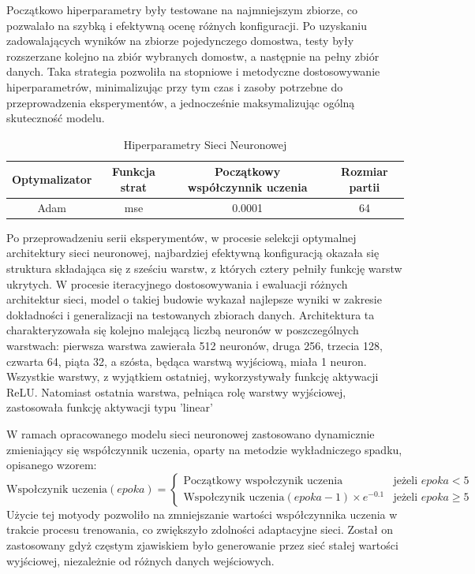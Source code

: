 \documentclass[a4paper,twoside,12pt]{book}
\begin{document}
Początkowo hiperparametry były testowane na najmniejszym zbiorze, co pozwalało na szybką i efektywną ocenę różnych konfiguracji. Po uzyskaniu zadowalających wyników na zbiorze pojedynczego domostwa, testy były rozszerzane kolejno na zbiór wybranych domostw, a następnie na pełny zbiór danych. Taka strategia pozwoliła na stopniowe i metodyczne dostosowywanie hiperparametrów, minimalizując przy tym czas i zasoby potrzebne do przeprowadzenia eksperymentów, a jednocześnie maksymalizując ogólną skuteczność modelu.
\begin{table}[!h]
	\centering
	\caption{Hiperparametry Sieci Neuronowej}
	\begin{tabular}{|c|c|c|c|}
		\hline
		Optymalizator & Funkcja strat & Początkowy współczynnik uczenia & Rozmiar partii \\ \hline
		Adam          & mse           & 0.0001                          & 64             \\ \hline
	\end{tabular}
\end{table}

Po przeprowadzeniu serii eksperymentów, w procesie selekcji optymalnej architektury sieci neuronowej, najbardziej efektywną konfiguracją okazała się struktura składająca się z sześciu warstw, z których cztery pełniły funkcję warstw ukrytych. W procesie iteracyjnego dostosowywania i ewaluacji różnych architektur sieci, model o takiej budowie wykazał najlepsze wyniki w zakresie dokładności i generalizacji na testowanych zbiorach danych. Architektura ta charakteryzowała się kolejno malejącą liczbą neuronów w poszczególnych warstwach: pierwsza warstwa zawierała 512 neuronów, druga 256, trzecia 128, czwarta 64, piąta 32, a szósta, będąca warstwą wyjściową, miała 1 neuron. Wszystkie warstwy, z wyjątkiem ostatniej, wykorzystywały funkcję aktywacji ReLU. Natomiast ostatnia warstwa, pełniąca rolę warstwy wyjściowej, zastosowała funkcję aktywacji typu 'linear'


W ramach opracowanego modelu sieci neuronowej zastosowano dynamicznie zmieniający się współczynnik uczenia, oparty na metodzie wykładniczego spadku, opisanego wzorem:
\begin{equation}
	\text{Wspołczynik uczenia}(epoka) =
	\begin{cases}
		\text{Początkowy wspołczynik uczenia}                 & \text{jeżeli } epoka < 5    \\
		\text{Wspołczynik uczenia}(epoka - 1) \times e^{-0.1} & \text{jeżeli } epoka \geq 5
	\end{cases}
\end{equation}
Użycie tej motyody pozwoliło na zmniejszanie wartości współczynnika uczenia w trakcie procesu trenowania, co zwiększyło zdolności adaptacyjne sieci. Został on zastosowany gdyż częstym zjawiskiem było generowanie przez sieć stałej wartości wyjściowej, niezależnie od różnych danych wejściowych.
\end{document}
